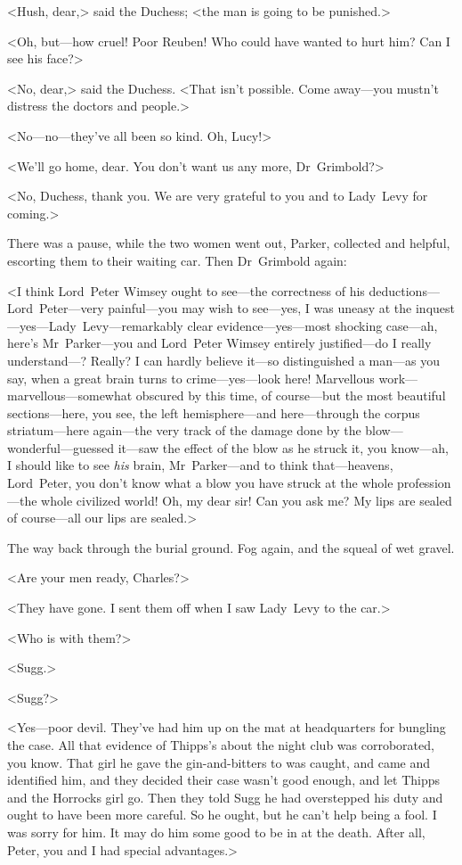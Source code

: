 <Hush, dear,> said the Duchess; <the man is going to be punished.>

<Oh, but—how cruel! Poor Reuben! Who could have wanted to hurt him? Can I see his face?>

<No, dear,> said the Duchess. <That isn't possible. Come away—you mustn't distress the doctors and people.>

<No—no—they've all been so kind. Oh, Lucy!>

<We'll go home, dear. You don't want us any more, Dr~Grimbold?>

<No, Duchess, thank you. We are very grateful to you and to Lady~Levy for coming.>

There was a pause, while the two women went out, Parker, collected and helpful, escorting them to their waiting car. Then Dr~Grimbold again:

<I think Lord~Peter Wimsey ought to see—the correctness of his deductions—Lord~Peter—very painful—you may wish to see—yes, I was uneasy at the inquest—yes—Lady~Levy—remarkably clear evidence—yes—most shocking case—ah, here's Mr~Parker—you and Lord~Peter Wimsey entirely justified—do I really under\-stand—? Really? I can hardly believe it—so distinguished a man—as you say, when a great brain turns to crime—yes—look here! Marvellous work—marvellous—somewhat obscured by this time, of course—but the most beautiful sections—here, you see, the left hemisphere—and here—through the corpus striatum—here again—the very track of the damage done by the blow—wonderful—guessed it—saw the effect of the blow as he struck it, you know—ah, I should like to see \emph{his} brain, Mr~Parker—and to think that—heavens, Lord~Peter, you don't know what a blow you have struck at the whole profession—the whole civilized world! Oh, my dear sir! Can you ask me? My lips are sealed of course—all our lips are sealed.>

The way back through the burial ground. Fog again, and the squeal of wet gravel.

<Are your men ready, Charles?>

<They have gone. I sent them off when I saw Lady~Levy to the car.>

<Who is with them?>

<Sugg.>

<Sugg?>

<Yes—poor devil. They've had him up on the mat at headquarters for bungling the case. All that evidence of Thipps's about the night club was corroborated, you know. That girl he gave the gin-and-bitters to was caught, and came and identified him, and they decided their case wasn't good enough, and let Thipps and the Horrocks girl go. Then they told Sugg he had overstepped his duty and ought to have been more careful. So he ought, but he can't help being a fool. I was sorry for him. It may do him some good to be in at the death. After all, Peter, you and I had special advantages.>

